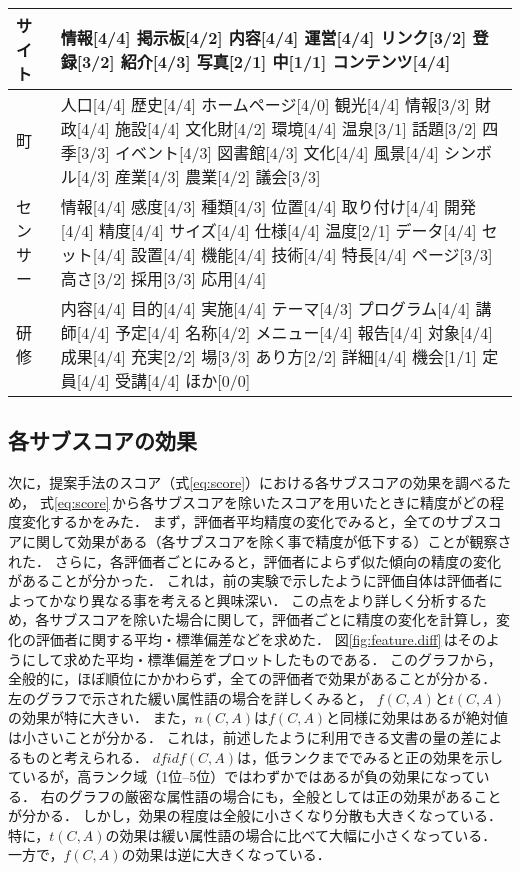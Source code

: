 \begin{table}[th]
\begin{center}
\begin{tabular}{|p{1.2cm}|p{12cm}|}
サイト &  情報[4/4] 掲示板[4/2] 内容[4/4] 運営[4/4] リンク[3/2] 登録[3/2] 紹介[4/3] 写真[2/1] 中[1/1] コンテンツ[4/4] \\ \hline
町 &  人口[4/4] 歴史[4/4] ホームページ[4/0] 観光[4/4] 情報[3/3] 財政[4/4] 施設[4/4] 文化財[4/2] 環境[4/4] 温泉[3/1] 話題[3/2] 四季[3/3] イベント[4/3] 図書館[4/3] 文化[4/4] 風景[4/4] シンボル[4/3] 産業[4/3] 農業[4/2] 議会[3/3] \\ \hline 
センサー &  情報[4/4] 感度[4/3] 種類[4/3] 位置[4/4] 取り付け[4/4] 開発[4/4] 精度[4/4] サイズ[4/4] 仕様[4/4] 温度[2/1] データ[4/4] セット[4/4] 設置[4/4] 機能[4/4] 技術[4/4] 特長[4/4] ページ[3/3] 高さ[3/2] 採用[3/3] 応用[4/4] \\ \hline 
研修 &  内容[4/4] 目的[4/4] 実施[4/4] テーマ[4/3] プログラム[4/4] 講師[4/4] 予定[4/4] 名称[4/2] メニュー[4/4] 報告[4/4] 対象[4/4] 成果[4/4] 充実[2/2] 場[3/3] あり方[2/2] 詳細[4/4] 機会[1/1] 定員[4/4] 受講[4/4] ほか[0/0] \\ \hline 
\end{tabular}
\end{center}
\end{table}


\subsection{各サブスコアの効果}

次に，提案手法のスコア（式\ref{eq:score}）における各サブスコアの効果を調べるため，
式\ref{eq:score}\,から各サブスコアを除いたスコアを用いたときに精度がどの程度変化するかをみた．
まず，評価者平均精度の変化でみると，全てのサブスコアに関して効果がある（各サブスコアを除く事で精度が低下する）ことが観察された．
さらに，各評価者ごとにみると，評価者によらず似た傾向の精度の変化があることが分かった． 
これは，前の実験で示したように評価自体は評価者によってかなり異なる事を考えると興味深い．
この点をより詳しく分析するため，各サブスコアを除いた場合に関して，評価者ごとに精度の変化を計算し，変化の評価者に関する平均・標準偏差などを求めた．
図\ref{fig:feature.diff}\,はそのようにして求めた平均・標準偏差をプロットしたものである．
このグラフから，全般的に，ほぼ順位にかかわらず，全ての評価者で効果があることが分かる．
左のグラフで示された緩い属性語の場合を詳しくみると，
$f(C,A)$と$t(C,A)$の効果が特に大きい．
また，$n(C,A)$は$f(C,A)$と同様に効果はあるが絶対値は小さいことが分かる．
これは，前述したように利用できる文書の量の差によるものと考えられる．
$dfidf(C,A)$は，低ランクまででみると正の効果を示しているが，高ランク域（1位--5位）ではわずかではあるが負の効果になっている．
右のグラフの厳密な属性語の場合にも，全般としては正の効果があることが分かる．
しかし，効果の程度は全般に小さくなり分散も大きくなっている． 
特に，$t(C,A)$の効果は緩い属性語の場合に比べて大幅に小さくなっている．
一方で，$f(C,A)$の効果は逆に大きくなっている．

